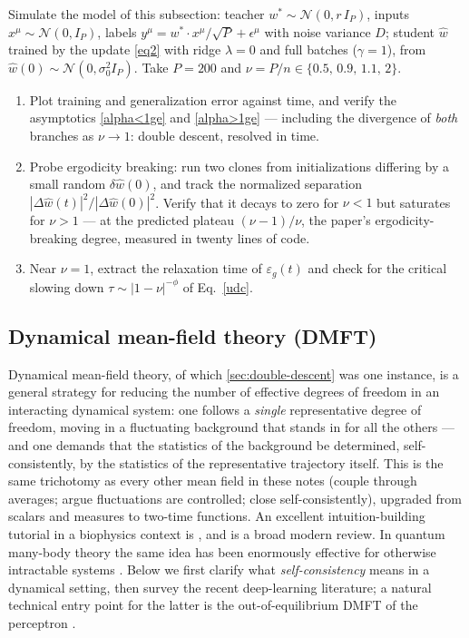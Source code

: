 \documentclass[11pt]{article}
\newcommand{\CN}{{\mathcal N}}
\begin{document}
\begin{exercise}
\label{ex:li-goldenfeld}
Simulate the model of this subsection: teacher $w^* \sim \CN(0, r\, I_P)$, inputs $x^\mu \sim \CN(0, I_P)$, labels $y^\mu = w^*\cdot x^\mu/\sqrt P + \epsilon^\mu$ with noise variance $D$; student $\hat w$ trained by the update \eqref{eq2} with ridge $\lambda = 0$ and full batches ($\gamma = 1$), from $\hat w(0)\sim\CN(0,\sigma_0^2 I_P)$. Take $P = 200$ and $\nu = P/n \in \{0.5,\, 0.9,\, 1.1,\, 2\}$.
\begin{enumerate}
  \item Plot training and generalization error against time, and verify the asymptotics \eqref{alpha<1ge} and \eqref{alpha>1ge} --- including the divergence of \emph{both} branches as $\nu\to1$: double descent, resolved in time.
  \item Probe ergodicity breaking: run two clones from initializations differing by a small random $\delta\hat w(0)$, and track the normalized separation $|\Delta \hat w(t)|^2/|\Delta\hat w(0)|^2$. Verify that it decays to zero for $\nu<1$ but saturates for $\nu>1$ --- at the predicted plateau $(\nu-1)/\nu$, the paper's ergodicity-breaking degree, measured in twenty lines of code.
  \item Near $\nu=1$, extract the relaxation time of $\varepsilon_g(t)$ and check for the critical slowing down $\tau \sim |1-\nu|^{-\phi}$ of Eq.~\eqref{udc}.
\end{enumerate}
\end{exercise}
%


\subsection{Dynamical mean-field theory (DMFT)}
\label{sec:DMFT-general}

Dynamical mean-field theory, of which \cref{sec:double-descent} was one instance, is a general strategy for reducing the number of effective degrees of freedom in an interacting dynamical system: one follows a \emph{single} representative degree of freedom, moving in a fluctuating background that stands in for all the others --- and one demands that the statistics of the background be determined, self-consistently, by the statistics of the representative trajectory itself. This is the same trichotomy as every other mean field in these notes (couple through averages; argue fluctuations are controlled; close self-consistently), upgraded from scalars and measures to two-time functions. An excellent intuition-building tutorial in a biophysics context is \cite{blumenthalBuildingIntuitionDynamical2025}, and \cite{cugliandoloRecentApplicationsDynamical2023} is a broad modern review. In quantum many-body theory the same idea has been enormously effective for otherwise intractable systems \cite{georgesDynamicalMeanfieldTheory1996,KotliarDMFT}. Below we first clarify what \emph{self-consistency} means in a dynamical setting, then survey the recent deep-learning literature; a natural technical entry point for the latter is the out-of-equilibrium DMFT of the perceptron \cite{agoritsas}.
\end{document}
